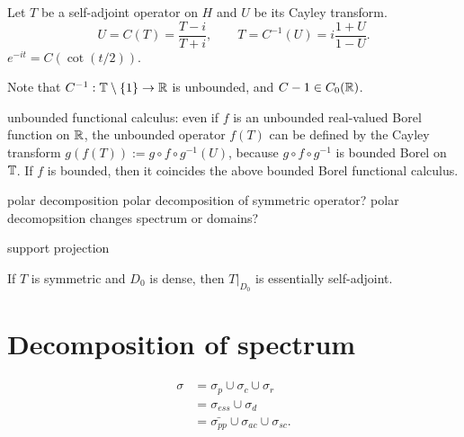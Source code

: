 \documentclass{../../large}
\begin{document}
\begin{prb}
Let $T$ be a self-adjoint operator on $H$ and $U$ be its Cayley transform.
\[U=C(T)=\frac{T-i}{T+i},\qquad T=C^{-1}(U)=i\frac{1+U}{1-U}.\]
$e^{-it}=C(\cot(t/2))$.
\begin{parts}
\item Note that $C^{-1}:\mathbb{T}\setminus\{1\}\to\mathbb{R}$ is unbounded, and $C-1\in C_0(\mathbb{R})$.
\item unbounded functional calculus: even if $f$ is an unbounded real-valued Borel function on $\mathbb{R}$, the unbounded operator $f(T)$ can be defined by the Cayley transform $g(f(T)):=g\circ f\circ g^{-1}(U)$, because $g\circ f\circ g^{-1}$ is bounded Borel on $\mathbb{T}$.
If $f$ is bounded, then it coincides the above bounded Borel functional calculus.
\end{parts}
\end{prb}


\begin{prb}
polar decomposition
polar decomposition of symmetric operator?
polar decomopsition changes spectrum or domains?

support projection
\end{prb}

\begin{prb}
\end{prb}

\begin{prb}
\begin{parts}
\item If $T$ is symmetric and $D_0$ is dense, then $T|_{D_0}$ is essentially self-adjoint.
\end{parts}
\end{prb}

\begin{prb}
\end{prb}




\section{Decomposition of spectrum}

\begin{align*}
\sigma
&=\sigma_p\cup\sigma_c\cup\sigma_r\\
&=\sigma_{ess}\cup\sigma_d\\
&=\bar{\sigma_{pp}}\cup\sigma_{ac}\cup\sigma_{sc}.
\end{align*}
\end{document}
